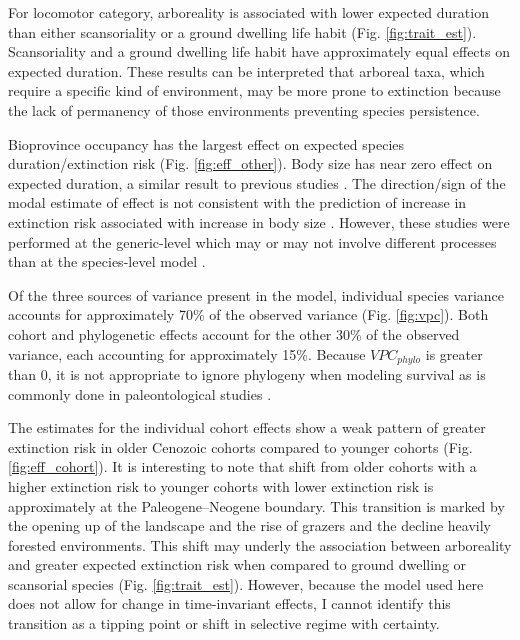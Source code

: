 \documentclass[12pt]{article}
\begin{document}
For locomotor category, arboreality is associated with lower expected duration than either scansoriality or a ground dwelling life habit (Fig. \ref{fig:trait_est}). Scansoriality and a ground dwelling life habit have approximately equal effects on expected duration. These results can be interpreted that arboreal taxa, which require a specific kind of environment, may be more prone to extinction because the lack of permanency of those environments preventing species persistence. 

Bioprovince occupancy has the largest effect on expected species duration/extinction risk (Fig. \ref{fig:eff_other}). Body size has near zero effect on expected duration, a similar result to previous studies \cite{Tomiya2013}. The direction/sign of the modal estimate of effect is not consistent with the prediction of increase in extinction risk associated with increase in body size \cite{Liow2008}. However, these studies were performed at the generic-level which may or may not involve different processes than at the species-level model \cite{Tomiya2013,Liow2008}.

Of the three sources of variance present in the model, individual species variance accounts for approximately 70\% of the observed variance (Fig. \ref{fig:vpc}). Both cohort and phylogenetic effects account for the other 30\% of the observed variance, each accounting for approximately 15\%. Because $VPC_{phylo}$ is greater than 0, it is not appropriate to ignore phylogeny when modeling survival \cite{Housworth2004} as is commonly done in paleontological studies \cite{Alroy2009,Foote2013,Jablonski2006a,Hunt2007a,Liow2008,Payne2007}. 

The estimates for the individual cohort effects show a weak pattern of greater extinction risk in older Cenozoic cohorts compared to younger cohorts (Fig. \ref{fig:eff_cohort}). It is interesting to note that shift from older cohorts with a higher extinction risk to younger cohorts with lower extinction risk is approximately at the Paleogene--Neogene boundary. This transition is marked by the opening up of the landscape and the rise of grazers and the decline heavily forested environments. This shift may underly the association between arboreality and greater expected extinction risk when compared to ground dwelling or scansorial species (Fig. \ref{fig:trait_est}). However, because the model used here does not allow for change in time-invariant effects, I cannot identify this transition as a tipping point or shift in selective regime with certainty.
\end{document}
